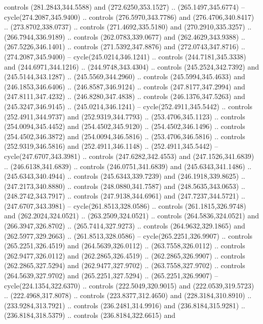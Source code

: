 \begin{scope}[cm={{1.25,0.0,0.0,-1.25,(0.0,743.43331)}}]
    controls (281.2843,344.5588) and (272.6250,353.1527) .. (265.1497,345.6774) --
    cycle(274.2087,345.9400) .. controls (276.5970,343.7786) and
    (276.4706,340.8417) .. (273.8702,338.0737) .. controls (271.4692,335.5180) and
    (270.2910,335.3257) .. (266.7944,336.9189) .. controls (262.0783,339.0677) and
    (262.4629,343.9388) .. (267.5226,346.1401) .. controls (271.5392,347.8876) and
    (272.0743,347.8716) .. (274.2087,345.9400) -- cycle(245.0214,346.1241) ..
    controls (244.7181,345.3338) and (244.6971,344.1216) .. (244.9748,343.4304) ..
    controls (245.2524,342.7392) and (245.5144,343.1287) .. (245.5569,344.2960) ..
    controls (245.5994,345.4633) and (246.1853,346.6406) .. (246.8587,346.9124) ..
    controls (247.8177,347.2994) and (247.8111,347.4232) .. (246.8280,347.4838) ..
    controls (246.1376,347.5263) and (245.3247,346.9145) .. (245.0214,346.1241) --
    cycle(252.4911,345.5442) .. controls (252.4911,344.9737) and
    (252.9319,344.7793) .. (253.4706,345.1123) .. controls (254.0094,345.4452) and
    (254.4502,345.9120) .. (254.4502,346.1496) .. controls (254.4502,346.3872) and
    (254.0094,346.5816) .. (253.4706,346.5816) .. controls (252.9319,346.5816) and
    (252.4911,346.1148) .. (252.4911,345.5442) -- cycle(247.6707,343.3981) ..
    controls (247.6282,342.4553) and (247.1526,341.6839) .. (246.6138,341.6839) ..
    controls (246.0751,341.6839) and (245.6343,341.1486) .. (245.6343,340.4944) ..
    controls (245.6343,339.7239) and (246.1918,339.8625) .. (247.2173,340.8880) ..
    controls (248.0880,341.7587) and (248.5635,343.0653) .. (248.2742,343.7917) ..
    controls (247.9138,344.6961) and (247.7237,344.5721) .. (247.6707,343.3981) --
    cycle(261.8513,328.0586) .. controls (261.1815,326.9748) and
    (262.2024,324.0521) .. (263.2509,324.0521) .. controls (264.5836,324.0521) and
    (266.3947,326.8702) .. (265.7414,327.9273) .. controls (264.9632,329.1865) and
    (262.5977,329.2663) .. (261.8513,328.0586) -- cycle(265.2251,326.9907) ..
    controls (265.2251,326.4519) and (264.5639,326.0112) .. (263.7558,326.0112) ..
    controls (262.9477,326.0112) and (262.2865,326.4519) .. (262.2865,326.9907) ..
    controls (262.2865,327.5294) and (262.9477,327.9702) .. (263.7558,327.9702) ..
    controls (264.5639,327.9702) and (265.2251,327.5294) .. (265.2251,326.9907) --
    cycle(224.1354,322.6370) .. controls (222.5049,320.9015) and
    (222.0539,319.5723) .. (222.4968,317.8078) .. controls (223.8377,312.4650) and
    (228.3184,310.8910) .. (233.9284,313.7921) .. controls (236.2481,314.9916) and
    (236.8184,315.9281) .. (236.8184,318.5379) .. controls (236.8184,322.6615) and

\end{scope}
